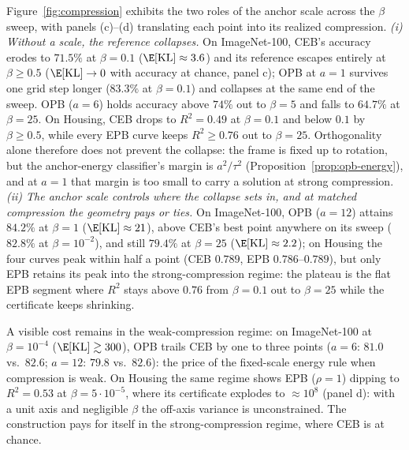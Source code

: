 \documentclass{article} %
\theoremstyle{plain}
\theoremstyle{remark}
\renewcommand{\KL}{\operatorname{KL}}
\begin{document}
Figure~\ref{fig:compression}
exhibits the two roles of the anchor scale across the $\beta$ sweep, with panels
(c)--(d) translating each point into its realized compression.
\emph{(i) Without a scale, the reference collapses.} On ImageNet-100, CEB's
accuracy erodes to $71.5\%$ at $\beta = 0.1$ ($\E[\KL] \approx 3.6$) and its
reference escapes entirely at $\beta \ge 0.5$ ($\E[\KL] \to 0$ with accuracy at
chance, panel c); OPB at $a = 1$ survives one grid step longer ($83.3\%$ at
$\beta = 0.1$) and collapses at the same end of the sweep. OPB ($a = 6$) holds
accuracy above $74\%$ out to $\beta = 5$ and falls to $64.7\%$ at $\beta = 25$.
On Housing, CEB drops to $R^2 = 0.49$ at $\beta = 0.1$ and below $0.1$
by $\beta \ge 0.5$, while every EPB curve keeps $R^2 \ge 0.76$ out to
$\beta = 25$. Orthogonality alone therefore does not prevent the collapse: the
frame is fixed up to rotation, but the anchor-energy classifier's margin is
$a^2/\tau^2$ (Proposition~\ref{prop:opb-energy}), and at $a = 1$ that margin is
too small to carry a solution at strong compression. \emph{(ii) The anchor scale
controls where the collapse sets in, and at matched compression the geometry pays
or ties.} On ImageNet-100, OPB ($a = 12$) attains $84.2\%$ at $\beta = 1$
($\E[\KL] \approx 21$), above CEB's best point anywhere on its sweep
($82.8\%$ at $\beta = 10^{-2}$), and still $79.4\%$ at $\beta = 25$
($\E[\KL] \approx 2.2$); on Housing the four curves peak within half a point
(CEB $0.789$, EPB $0.786$--$0.789$), but only EPB retains its peak into the
strong-compression regime: the plateau is the flat EPB segment where $R^2$ stays
above $0.76$ from $\beta = 0.1$ out to $\beta = 25$ while the certificate keeps
shrinking.

A visible cost remains in the weak-compression regime: on ImageNet-100 at
$\beta = 10^{-4}$ ($\E[\KL] \gtrsim 300$), OPB trails CEB by one to three points
($a = 6$: $81.0$ vs.\ $82.6$; $a = 12$: $79.8$ vs.\ $82.6$): the price of the
fixed-scale energy rule when compression is weak. On Housing the same regime
shows EPB ($\rho = 1$) dipping to $R^2 = 0.53$ at $\beta = 5{\cdot}10^{-5}$,
where its certificate explodes to $\approx 10^{8}$ (panel d): with a unit axis
and negligible $\beta$ the off-axis variance is unconstrained. The construction
pays for itself in the strong-compression regime, where CEB is at chance.
\end{document}
